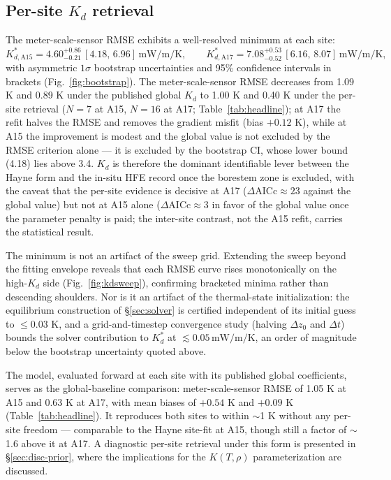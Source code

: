 \documentclass[11pt]{article}
\begin{document}
\label{sec:headline-table}

\subsection{Per-site $K_d$ retrieval}\label{sec:results-kd}
The meter-scale-sensor RMSE exhibits a well-resolved
minimum at each site:
\[
K_{d,\mathrm{A15}}^{*}=4.60^{+0.86}_{-0.21}\,[4.18,\,6.96]\,\si{\milli\watt\per\meter\per\kelvin},\qquad
K_{d,\mathrm{A17}}^{*}=7.08^{+0.53}_{-0.52}\,[6.16,\,8.07]\,\si{\milli\watt\per\meter\per\kelvin},
\]
with asymmetric $1\sigma$ bootstrap uncertainties and 95\% confidence
intervals in brackets (Fig.~\ref{fig:bootstrap}). The
meter-scale-sensor RMSE decreases from
1.09 K and 0.89 K under the published
global $K_d$ to 1.00 K and 0.40 K under the
per-site retrieval ($N=7$ at A15, $N=16$ at A17;
Table~\ref{tab:headline}); at A17 the refit halves the RMSE and removes the
gradient misfit (bias $+0.12$ K), while at A15 the improvement is
modest and the global value is not excluded by the RMSE criterion
alone --- it is excluded by the bootstrap CI, whose lower bound
(4.18) lies above 3.4.
$K_d$ is therefore the dominant identifiable lever between the Hayne form
and the in-situ HFE record once the borestem zone is excluded,
with the caveat that the per-site evidence is decisive at A17
($\Delta\mathrm{AICc}\approx 23$ against the global value) but not at
A15 alone ($\Delta\mathrm{AICc}\approx 3$ in favor of the
global value once the parameter penalty is paid; the inter-site
contrast, not the A15 refit, carries the statistical result.

The minimum is not an artifact of the sweep grid. Extending the sweep
beyond the fitting envelope reveals that each RMSE curve rises
monotonically on the high-$K_d$ side (Fig.~\ref{fig:kdsweep}), confirming
bracketed minima rather than descending shoulders. Nor is it an
artifact of the thermal-state initialization: the equilibrium
construction of \S\ref{sec:solver} is certified independent of its
initial guess to $\le 0.03$ K, and a grid-and-timestep convergence study
(halving $\Delta z_0$ and $\Delta t$) bounds the solver contribution to
$K_d^{*}$ at $\lesssim 0.05\,\si{\milli\watt\per\meter\per\kelvin}$,
an order of magnitude below the bootstrap uncertainty quoted above.

The \citet{martinez2021} model, evaluated forward at each site with its
published global coefficients, serves as the global-baseline comparison:
meter-scale-sensor RMSE of 1.05 K
at A15 and 0.63 K at A17, with mean biases of $+0.54$ K and $+0.09$ K
(Table~\ref{tab:headline}). It reproduces
both sites to within $\sim$1 K without any per-site freedom ---
comparable to the Hayne site-fit at A15, though still a factor of
$\sim$1.6 above it at A17. A diagnostic per-site retrieval under
this form is presented in \S\ref{sec:disc-prior}, where the implications
for the $K(T,\rho)$ parameterization are discussed.
\end{document}
